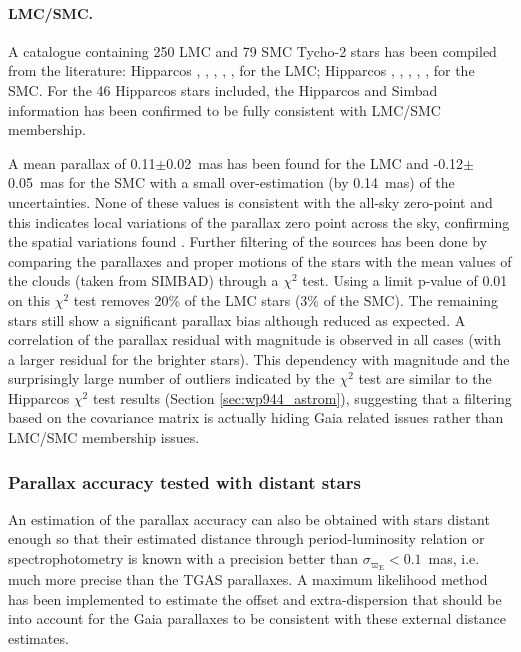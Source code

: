  \paragraph{LMC/SMC.}
 A catalogue containing 250 LMC and 79 SMC Tycho-2 stars has been compiled from the literature: Hipparcos 
\citep[Annex 4 of][]{1992ESASP1136.....T}, \cite{1989ESASP1111B.191P}, \cite{2008AcA....58..163S}, \cite{2009AJ....138.1003B}, \cite{2009ApJS..184..172G}, \cite{2012ApJ...749..177N} for the LMC; Hipparcos \citep[Annex 4 of][]{1992ESASP1136.....T}, \cite{1989ESASP1111B.191P}, \cite{2010AcA....60...91S}, \cite{2004MNRAS.353..601E}, \cite{2010AJ....140..416B}, \cite{2010ApJ...719.1784N} for the SMC. 
 For the 46 Hipparcos stars included, the Hipparcos and Simbad information has been confirmed to be fully consistent with LMC/SMC membership.  
 
A mean parallax of 0.11$\pm$0.02~mas has been found for the LMC and -0.12$\pm$0.05~mas for the SMC with a small over-estimation (by 0.14~mas) of the uncertainties. None of these values is consistent with the all-sky zero-point and this indicates local variations of the parallax zero point across the sky, confirming the spatial variations found . Further filtering of the sources has been done by comparing the parallaxes and proper motions of the stars with the mean values of the clouds (taken from SIMBAD) through a $\chi^2$ test. Using a limit p-value of 0.01 on this $\chi^2$ test removes 20\% of the LMC stars (3\% of the SMC). The remaining stars still show a significant parallax bias although reduced as expected. A correlation of the parallax residual with magnitude is observed in all cases (with a larger residual for the brighter stars). This dependency with magnitude and the surprisingly large number of outliers indicated by the $\chi^2$ test are similar to the Hipparcos $\chi^2$ test results (Section \ref{sec:wp944_astrom}), suggesting that a filtering based on the covariance matrix is actually hiding Gaia related issues rather than LMC/SMC membership issues. 

\subsubsection{Parallax accuracy tested with distant stars}\label{sec:distantstars}

An estimation of the parallax accuracy can also be obtained with stars distant enough so that their estimated distance through period-luminosity relation or spectrophotometry is known with a precision better than $\sigma_{\varpi_\mathrm{E}}<0.1$~mas, i.e. much more precise than the TGAS parallaxes. A maximum likelihood method \citep[improved from][Sect. 4]{1995A&A...304...52A} has been implemented to estimate the offset and extra-dispersion that should be  into account for the Gaia parallaxes to be consistent with these external distance estimates. 

